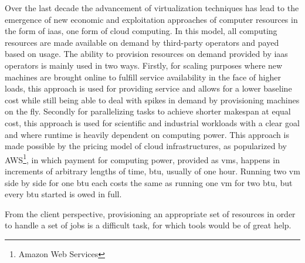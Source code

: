 \documentclass[10pt,conference,compsocconf]{IEEEtran}
\begin{document}
Over the  last decade the advancement  of virtualization techniques has  lead to
the emergence of new economic and exploitation approaches of computer resources in
the form of \ac{iaas}, one form of cloud computing. In this model, all computing
resources are made available on demand  by third-party operators and payed based
on usage.   The ability to provision  resources on demand provided  by \ac{iaas}
operators is mainly  used in two ways.  Firstly, for  scaling purposes where new
machines  are brought  online to  fulfill service  availability in  the face  of
higher loads, this approach is used for providing service and allows for a lower
baseline cost while still being able to deal with spikes in demand by provisioning
machines  on  the fly. Secondly  for  parallelizing  tasks to  achieve  shorter
makespan at  equal cost,  this approach  is used  for scientific  and industrial
workloads with a clear goal and  where runtime is heavily  dependent on computing
power.   This  approach  is  made  possible   by  the  pricing  model  of  cloud
infrastructures, as  popularized by  AWS\footnote{Amazon Web Services},  in which
payment  for computing  power, provided  as  \acp{vm}, happens  in increments of
arbitrary lengths of time, \ac{btu},  usually of  one hour. Running  two \ac{vm}
side by side for one \ac{btu} each costs the same as running one \ac{vm} for two
\ac{btu}, but every \ac{btu} started is owed in full.

From the client  perspective, provisioning an appropriate set  of resources in
order to  handle a set of  jobs is a difficult  task, for which tools would be 
of great help.   
\end{document}
